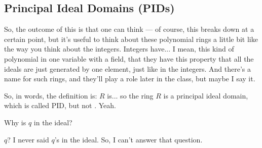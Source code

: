 \begin{proofWrapper}

\end{proofWrapper}

\subsection{Principal Ideal Domains (PIDs)}

\begin{speech}[00:38:47 - 00:40:01]
So, the outcome of this is that one can think --- of course, this breaks down at a certain point, but it's useful to think about these polynomial rings a little bit like the way you think about the integers. Integers have... I mean, this kind of polynomial in one variable with a field, that they have this property that all the ideals are just generated by one element, just like in the integers. And there's a name for such rings, and they'll play a role later in the class, but maybe I say it.

So, in words, the definition is: $R$ is... so the ring $R$ is a principal ideal domain, which is called PID, but not . Yeah.
\end{speech}

\begin{student}
Why is $q$ in the ideal?
\end{student}

\begin{speech}[00:40:04 - 00:40:09]
$q$? I never said $q$'s in the ideal. So, I can't answer that question.
\end{speech}

